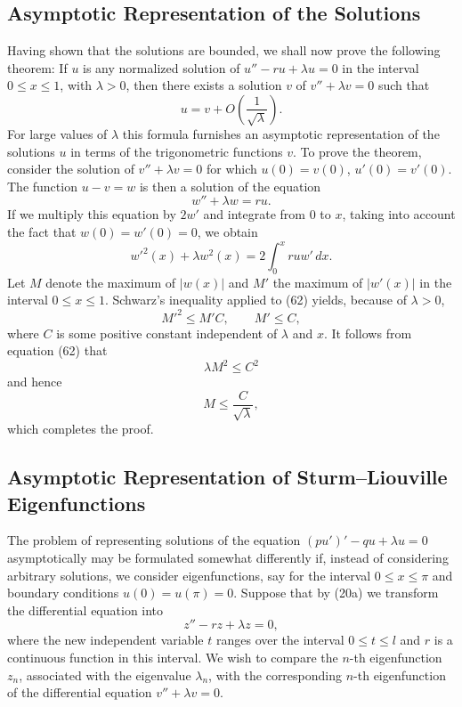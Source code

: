 \subsection{Asymptotic Representation of the Solutions}
Having shown that the solutions are bounded, we shall now prove the following theorem: If $u$ is any normalized solution of $u''-ru+\lambda u=0$ in the interval $0\le x\le1$, with $\lambda>0$, then there exists a solution $v$ of $v''+\lambda v=0$ such that
\[
u=v+O\left(\frac1{\sqrt\lambda}\right).
\]
For large values of $\lambda$ this formula furnishes an asymptotic representation of the solutions $u$ in terms of the trigonometric functions $v$. To prove the theorem, consider the solution of $v''+\lambda v=0$ for which $u(0)=v(0)$, $u'(0)=v'(0)$. The function $u-v=w$ is then a solution of the equation
\[
w''+\lambda w=ru.
\]
If we multiply this equation by $2w'$ and integrate from 0 to $x$, taking into account the fact that $w(0)=w'(0)=0$, we obtain
\begin{equation}
w'^2(x)+\lambda w^2(x)=2\int_0^xruw'\,dx.
\tag{62}
\end{equation}
Let $M$ denote the maximum of $|w(x)|$ and $M'$ the maximum of $|w'(x)|$ in the interval $0\le x\le1$. Schwarz's inequality applied to (62) yields, because of $\lambda>0$,
\[
M'^2\le M'C,\qquad M'\le C,
\]
where $C$ is some positive constant independent of $\lambda$ and $x$. It follows from equation (62) that
\[
\lambda M^2\le C^2
\]
and hence
\[
M\le\frac{C}{\sqrt\lambda},
\]
which completes the proof.

\subsection{Asymptotic Representation of Sturm--Liouville Eigenfunctions}
The problem of representing solutions of the equation $(pu')'-qu+\lambda u=0$ asymptotically may be formulated somewhat differently if, instead of considering arbitrary solutions, we consider eigenfunctions, say for the interval $0\le x\le\pi$ and boundary conditions $u(0)=u(\pi)=0$. Suppose that by (20a) we transform the differential equation into
\begin{equation}
z''-rz+\lambda z=0,
\tag{63}
\end{equation}
where the new independent variable $t$ ranges over the interval $0\le t\le l$ and $r$ is a continuous function in this interval. We wish to compare the $n$-th eigenfunction $z_n$, associated with the eigenvalue $\lambda_n$, with the corresponding $n$-th eigenfunction of the differential equation $v''+\lambda v=0$.

